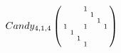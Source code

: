 $Candy_{4,1,4}\left(\begin{smallmatrix}
  &   &   & 1 &   &   &   \\
  &   &   &   & 1 &   &   \\
  &   &   &   &   & 1 &   \\
1 &   &   & 1 &   &   & 1 \\
  & 1 &   &   &   &   &   \\
  &   & 1 &   &   &   &   \\
  &   &   & 1 &   &   & 
\end{smallmatrix}\right)$
